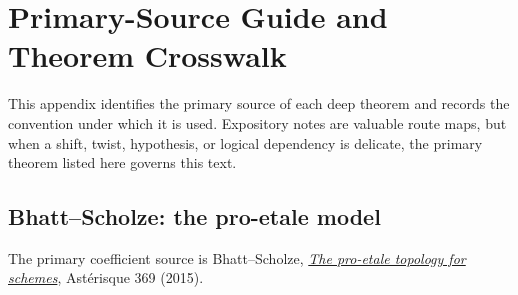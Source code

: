 \chapter{Primary-Source Guide and Theorem Crosswalk}
\label{app:proetale-references}

This appendix identifies the primary source of each deep theorem and records
the convention under which it is used.  Expository notes are valuable route
maps, but when a shift, twist, hypothesis, or logical dependency is delicate,
the primary theorem listed here governs this text.

\section{Bhatt--Scholze: the pro-etale model}

The primary coefficient source is Bhatt--Scholze,
\href{https://people.mpim-bonn.mpg.de/scholze/proetale.pdf}
{\emph{The pro-etale topology for schemes}}, Astérisque 369 (2015).

